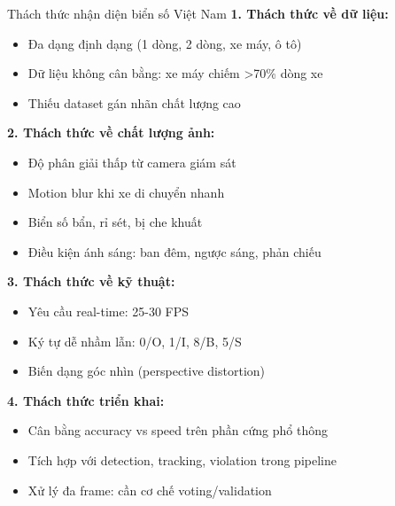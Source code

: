 \begin{frame}[allowframebreaks]{Thách thức nhận diện biển số Việt Nam}
    \textbf{1. Thách thức về dữ liệu:}
    \begin{itemize}
        \item Đa dạng định dạng (1 dòng, 2 dòng, xe máy, ô tô)
        \item Dữ liệu không cân bằng: xe máy chiếm >70\% dòng xe
        \item Thiếu dataset gán nhãn chất lượng cao
    \end{itemize}
    
    \textbf{2. Thách thức về chất lượng ảnh:}
    \begin{itemize}
        \item Độ phân giải thấp từ camera giám sát
        \item Motion blur khi xe di chuyển nhanh
        \item Biển số bẩn, rỉ sét, bị che khuất
        \item Điều kiện ánh sáng: ban đêm, ngược sáng, phản chiếu
    \end{itemize}
    
    \framebreak
    
    \textbf{3. Thách thức về kỹ thuật:}
    \begin{itemize}
        \item Yêu cầu real-time: 25-30 FPS
        \item Ký tự dễ nhầm lẫn: 0/O, 1/I, 8/B, 5/S
        \item Biến dạng góc nhìn (perspective distortion)
    \end{itemize}
    
    \textbf{4. Thách thức triển khai:}
    \begin{itemize}
        \item Cân bằng accuracy vs speed trên phần cứng phổ thông
        \item Tích hợp với detection, tracking, violation trong pipeline
        \item Xử lý đa frame: cần cơ chế voting/validation
    \end{itemize}
\end{frame}

